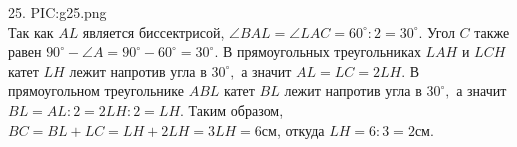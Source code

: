 25. {{PIC:g25.png}}\\
Так как $AL$ является биссектрисой, $\angle BAL=\angle LAC=60^\circ:2=30^\circ.$ Угол $C$ также равен $90^\circ-\angle A=90^\circ-60^\circ=30^\circ.$ В прямоугольных треугольниках $LAH$ и $LCH$ катет $LH$ лежит напротив угла в $30^\circ,$ а значит $AL=LC=2LH.$ В прямоугольном треугольнике $ABL$ катет $BL$ лежит напротив угла
в $30^\circ,$ а значит $BL=AL:2=2LH:2=LH.$ Таким образом, $BC=BL+LC=LH+2LH=3LH=6$см, откуда $LH=6:3=2$см.\newpage\noindent

